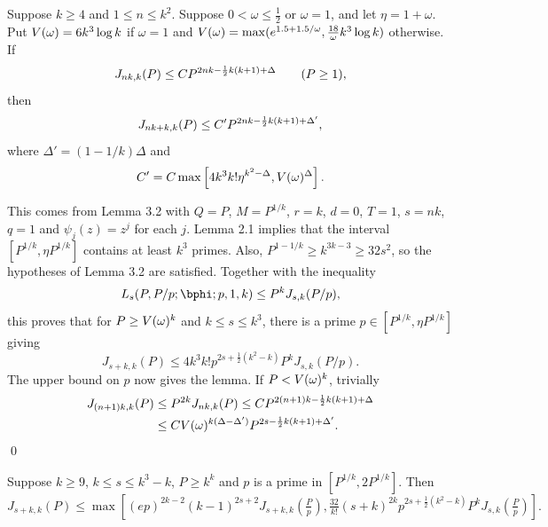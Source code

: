 Suppose $k\ge 4$ and $1\le n \le k^2$.  Suppose $0 < \omega\le \frac12$
or $\omega=1$, and let $\eta=1+\omega$.  Put
$V(\omega)=6k^3\log k$ if $\omega=1$ and 
$V(\omega)=\max(e^{1.5+1.5/\omega},\tfrac{18}{\omega} k^3\log k)$ otherwise.  If
$$
J_{nk,k}(P) \le C P^{2nk-\frac12 k(k+1)+\Delta} \qquad (P\ge 1),
$$
then
$$
J_{nk+k,k}(P) \le C' P^{2n k -\frac12 k(k+1) + \Delta'},
$$
where $\Delta' = (1-1/k)\Delta$ and
$$
C' = C \max \left[ 4k^3 k! \eta^{k^2-\Delta}, 
V(\omega)^{\Delta} \right].
$$
\endproclaim

This comes from Lemma 3.2 with $Q=P$, $M=P^{1/k}$, $r=k$, $d=0$, 
$T=1$, $s=nk$, $q=1$ and $\psi_j(z)=z^j$ for each $j$.
Lemma 2.1 implies that the interval $[P^{1/k},\eta P^{1/k}]$ contains at
least $k^3$ primes.
Also, $P^{1-1/k} \ge k^{3k-3}\ge 32s^2$, so the
hypotheses of Lemma 3.2 are satisfied.  Together with the inequality
$$
L_s(P,P/p;\bphi;p,1,k) \le P^k J_{s,k}(P/p),
$$
this proves that for $P\ge V(\omega)^k$ and
$k\le s \le k^3$, there is a  prime $p\in [P^{1/k},\eta P^{1/k}]$ giving
$$
J_{s+k,k}(P) \le 4k^3 k! p^{2s+\frac12(k^2-k)} P^k J_{s,k}(P/p).
\tag{6.10}
$$
The upper bound on $p$ now gives the lemma.
If $P<V(\omega)^k$, trivially
$$
\split
J_{(n+1)k,k}(P) &\le P^{2k} J_{nk,k}(P) \le C P^{2(n+1)k-\kk+\Delta}\\
&\le C V(\om)^{k(\Delta-\Delta')} P^{2s-\kk+\Delta'}.
\endsplit
$$
\qed\enddemo

%
%
%

  Suppose $k\ge 9$, $k\le s\le k^3-k$, $P\ge k^k$ and
$p$ is a prime in $[P^{1/k}, 2P^{1/k}]$.  Then
$$
J_{s+k,k}(P) \le  \max\left[ (ep)^{2k-2}(k-1)^{2s+2}J_{s+k,k}(\tfrac{P}{p}),
\tfrac{32}{k!} (s+k)^{2k} p^{2s+\frac12 (k^2-k)} P^k J_{s,k}(\tfrac{P}{p})
\right].
$$
\endproclaim

